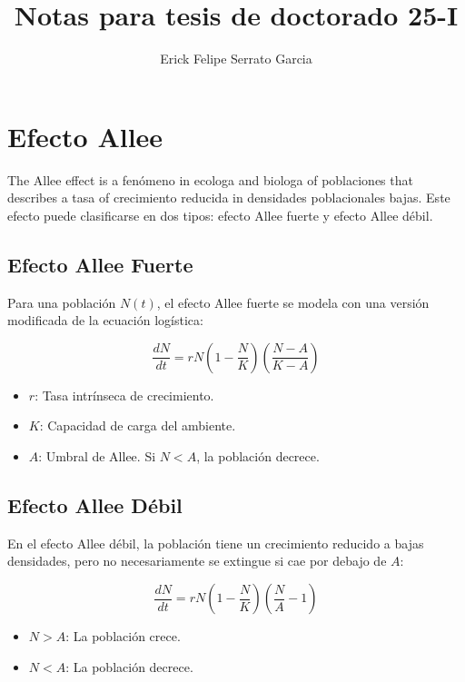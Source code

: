 \documentclass{article}
\title{Notas para tesis de doctorado 25-I}
\author{Erick Felipe Serrato Garcia}
\begin{document}
\maketitle

\section{Efecto Allee}

The Allee effect is a fenómeno in ecologa and biologa of poblaciones that describes a tasa of crecimiento reducida in densidades poblacionales bajas. Este efecto puede clasificarse en dos tipos: efecto Allee fuerte y efecto Allee débil.

\subsection{Efecto Allee Fuerte}

Para una población $N(t)$, el efecto Allee fuerte se modela con una versión modificada de la ecuación logística:

\begin{equation}
\frac{dN}{dt} = rN \left(1 - \frac{N}{K}\right) \left(\frac{N - A}{K - A}\right)
\label{eq:strong_allee}
\end{equation}

\begin{itemize}
\item $r$: Tasa intrínseca de crecimiento.
\item $K$: Capacidad de carga del ambiente.
\item $A$: Umbral de Allee. Si $N < A$, la población decrece.
\end{itemize}

\subsection{Efecto Allee Débil}

En el efecto Allee débil, la población tiene un crecimiento reducido a bajas densidades, pero no necesariamente se extingue si cae por debajo de $A$:

\begin{equation}
\frac{dN}{dt} = rN \left(1 - \frac{N}{K}\right) \left(\frac{N}{A} - 1\right)
\end{equation}

\begin{itemize}
\item $N > A$: La población crece.
\item $N < A$: La población decrece.
\end{itemize}
\end{document}
